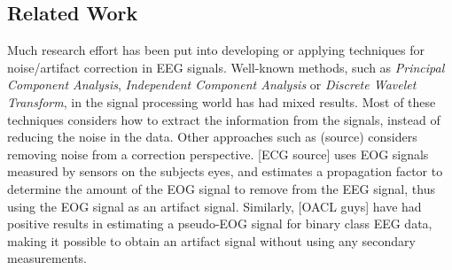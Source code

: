 \subsection{Related Work}
Much research effort has been put into developing or applying techniques for noise/artifact correction in EEG signals. Well-known methods, such as \textit{Principal Component Analysis}, \textit{Independent Component Analysis} or \textit{Discrete Wavelet Transform}, in the signal processing world has had mixed results. Most of these techniques considers how to extract the information from the signals, instead of reducing the noise in the data.
Other approaches such as (source) considers removing noise from a correction perspective. [ECG source] uses EOG signals measured by sensors on the subjects eyes, and estimates a propagation factor to determine the amount of the EOG signal to remove from the EEG signal, thus using the EOG signal as an artifact signal. Similarly, [OACL guys] have had positive results in estimating a pseudo-EOG signal for binary class EEG data, making it possible to obtain an artifact signal without using any secondary measurements.
